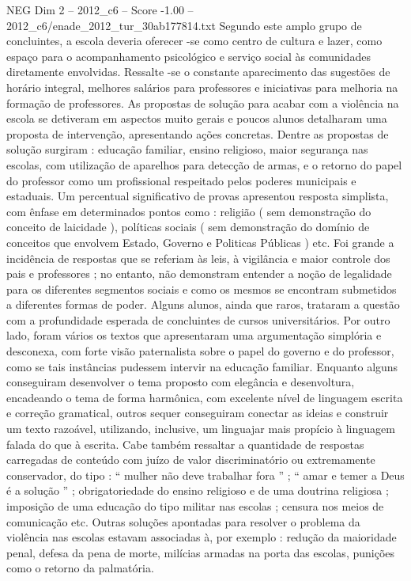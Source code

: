 \begin{textsample}{NEG Dim 2 – 2012\_c6 – Score -1.00 – 2012\_c6/enade\_2012\_tur\_30ab177814.txt}
Segundo este amplo grupo de concluintes, a escola deveria oferecer -se como centro de cultura e lazer, como espaço para o acompanhamento psicológico e serviço social às comunidades diretamente envolvidas.
Ressalte -se o constante aparecimento das sugestões de horário integral, melhores salários para professores e iniciativas para melhoria na formação de professores.
As propostas de solução para acabar com a violência na escola se detiveram em aspectos muito gerais e poucos alunos detalharam uma proposta de intervenção, apresentando ações concretas.
Dentre as propostas de solução surgiram : educação familiar, ensino religioso, maior segurança nas escolas, com utilização de aparelhos para detecção de armas, e o retorno do papel do professor como um profissional respeitado pelos poderes municipais e estaduais.
Um percentual significativo de provas apresentou resposta simplista, com ênfase em determinados pontos como : religião ( sem demonstração do conceito de laicidade ), políticas sociais ( sem demonstração do domínio de conceitos que envolvem Estado, Governo e Politicas Públicas ) etc.
Foi grande a incidência de respostas que se referiam às leis, à vigilância e maior controle dos pais e professores ; no entanto, não demonstram entender a noção de legalidade para os diferentes segmentos sociais e como os mesmos se encontram submetidos a diferentes formas de poder.
Alguns alunos, ainda que raros, trataram a questão com a profundidade esperada de concluintes de cursos universitários.
Por outro lado, foram vários os textos que apresentaram uma argumentação simplória e desconexa, com forte visão paternalista sobre o papel do governo e do professor, como se tais instâncias pudessem intervir na educação familiar.
Enquanto alguns conseguiram desenvolver o tema proposto com elegância e desenvoltura, encadeando o tema de forma harmônica, com excelente nível de linguagem escrita e correção gramatical, outros sequer conseguiram conectar as ideias e construir um texto razoável, utilizando, inclusive, um linguajar mais propício à linguagem falada do que à escrita.
Cabe também ressaltar a quantidade de respostas carregadas de conteúdo com juízo de valor discriminatório ou extremamente conservador, do tipo : “ mulher não deve trabalhar fora ” ; “ amar e temer a Deus é a solução ” ; obrigatoriedade do ensino religioso e de uma doutrina religiosa ; imposição de uma educação do tipo militar nas escolas ; censura nos meios de comunicação etc.
Outras soluções apontadas para resolver o problema da violência nas escolas estavam associadas à, por exemplo : redução da maioridade penal, defesa da pena de morte, milícias armadas na porta das escolas, punições como o retorno da palmatória.

\end{textsample}
